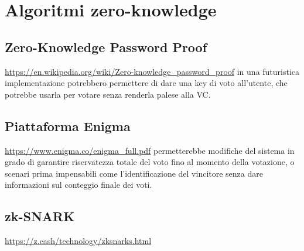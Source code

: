 \section{Algoritmi zero-knowledge}

	\subsection{Zero-Knowledge Password Proof}
		\url{https://en.wikipedia.org/wiki/Zero-knowledge_password_proof} in una futuristica implementazione potrebbero permettere di dare una key di voto all'utente, che potrebbe usarla per votare senza renderla palese alla VC.

	\subsection{Piattaforma Enigma}
		\url{https://www.enigma.co/enigma_full.pdf} permetterebbe modifiche del sistema in grado di garantire riservatezza totale del voto fino al momento della votazione, o scenari prima impensabili come l'identificazione del vincitore senza dare informazioni sul conteggio finale dei voti.

	\subsection{zk-SNARK}
		\url{https://z.cash/technology/zksnarks.html}